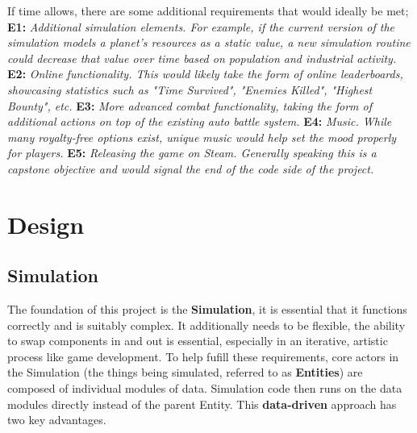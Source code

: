 \documentclass{report}
\newcommand{\req}[2]{\textbf{		#1:  }	\textit{#2}\newline\newline}
\begin{document}
If time allows, there are some additional requirements that would ideally be met;
\newline
\newline
\req{E1}{Additional simulation elements. For example, if the current version of the simulation models a planet's resources as a static value, a new simulation routine could decrease that value over time based on population and industrial activity.}
\req{E2}{Online functionality. This would likely take the form of online leaderboards, showcasing statistics such as "Time Survived", "Enemies Killed", "Highest Bounty", etc.}
\req{E3}{More advanced combat functionality, taking the form of additional actions on top of the existing auto battle system. }
\req{E4}{Music. While many royalty-free options exist, unique music would help set the mood properly for players.}
\req{E5}{Releasing the game on Steam. Generally speaking this is a capstone objective and would signal the end of the code side of the project. }

\chapter{Design}

\section{Simulation}

The foundation of this project is the \textbf{Simulation}, it is essential that it functions correctly and is suitably complex. It additionally needs to be flexible, the ability to swap components in and out is essential, especially in an iterative, artistic process like game development. To help fufill these requirements, core actors in the Simulation (the things being simulated, referred to as \textbf{Entities}) are composed of individual modules of data. Simulation code then runs on the data modules directly instead of the parent Entity. This \textbf{data-driven} approach has two key advantages.
\end{document}
